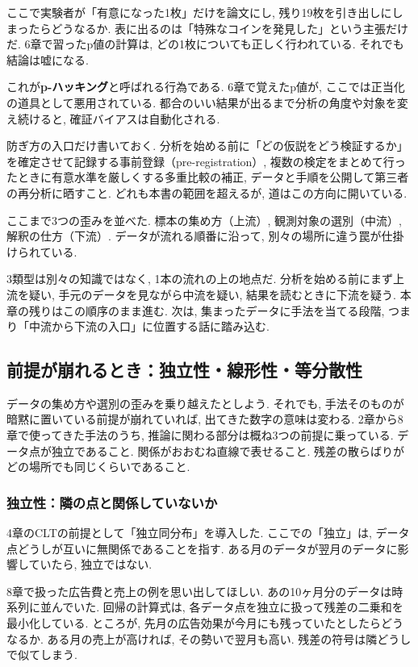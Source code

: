 ここで実験者が「有意になった1枚」だけを論文にし, 残り19枚を引き出しにしまったらどうなるか.
表に出るのは「特殊なコインを発見した」という主張だけだ.
6章で習ったp値の計算は, どの1枚についても正しく行われている.
それでも結論は嘘になる.

これが\textbf{p-ハッキング}と呼ばれる行為である.
6章で覚えたp値が, ここでは正当化の道具として悪用されている.
都合のいい結果が出るまで分析の角度や対象を変え続けると, 確証バイアスは自動化される.

防ぎ方の入口だけ書いておく.
分析を始める前に「どの仮説をどう検証するか」を確定させて記録する事前登録（pre-registration）, 複数の検定をまとめて行ったときに有意水準を厳しくする多重比較の補正, データと手順を公開して第三者の再分析に晒すこと.
どれも本書の範囲を超えるが, 道はこの方向に開いている.

ここまで3つの歪みを並べた.
標本の集め方（上流）, 観測対象の選別（中流）, 解釈の仕方（下流）.
データが流れる順番に沿って, 別々の場所に違う罠が仕掛けられている.

3類型は別々の知識ではなく, 1本の流れの上の地点だ.
分析を始める前にまず上流を疑い, 手元のデータを見ながら中流を疑い, 結果を読むときに下流を疑う.
本章の残りはこの順序のまま進む.
次は, 集まったデータに手法を当てる段階, つまり「中流から下流の入口」に位置する話に踏み込む.


\subsection{前提が崩れるとき：独立性・線形性・等分散性}

データの集め方や選別の歪みを乗り越えたとしよう.
それでも, 手法そのものが暗黙に置いている前提が崩れていれば, 出てきた数字の意味は変わる.
2章から8章で使ってきた手法のうち, 推論に関わる部分は概ね3つの前提に乗っている.
データ点が独立であること. 関係がおおむね直線で表せること. 残差の散らばりがどの場所でも同じくらいであること.

\subsubsection*{独立性：隣の点と関係していないか}

4章のCLTの前提として「独立同分布」を導入した.
ここでの「独立」は, データ点どうしが互いに無関係であることを指す.
ある月のデータが翌月のデータに影響していたら, 独立ではない.

8章で扱った広告費と売上の例を思い出してほしい.
あの10ヶ月分のデータは時系列に並んでいた.
回帰の計算式は, 各データ点を独立に扱って残差の二乗和を最小化している.
ところが, 先月の広告効果が今月にも残っていたとしたらどうなるか.
ある月の売上が高ければ, その勢いで翌月も高い. 残差の符号は隣どうしで似てしまう.

